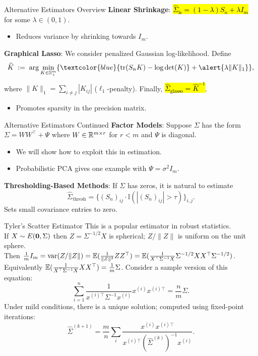 \documentclass[11pt,handout,aspectratio=169]{beamer}
\begin{document}
\begin{frame}{Alternative Estimators Overview}
  \textbf{Linear Shrinkage}: \hl{$\widehat{\Sigma}_{\text{ls}} = (1 - \lambda) S_n + \lambda I_m$} for some $\lambda\in (0,1)$.
  \begin{itemize}
  	\item Reduces variance by shrinking towards $I_m$.\\[5mm]
  \end{itemize}
  
 
  \textbf{Graphical Lasso}: We consider penalized Gaussian log-likelihood. Define
   \[\widehat{K} \;:=\; \arg\min_{K\in \mathbb S^m_+ }\{\textcolor{blue}{\mathrm{tr}(S_nK)-\log\det(K)}+\alert{\lambda\|K\|_1}\},\]
   where $\|K\|_1=\sum_{i\neq j}|K_{ij}|$ ($\ell_1$-penalty). Finally, 
  \hl{$\widehat \Sigma_{\text{glasso}}=\widehat K^{-1}$}.
  \begin{itemize}
  	\item Promotes sparsity in the precision matrix.
  \end{itemize}
\end{frame}

\begin{frame}{Alternative Estimators Continued}
  \textbf{Factor Models}: Suppose $\Sigma$ has the form
  $\Sigma = WW^\top + \Psi$ 
  where $W\in \mathbb R^{m\times r}$ for $r<m$ and $\Psi$ is diagonal.
  \begin{itemize}
  	\item We will show how to exploit this in estimation.
  	\item Probabilistic PCA gives one example with $\Psi=\sigma^2 I_m$. \\[5mm]
  \end{itemize}
  
  
  \textbf{Thresholding-Based Methods}: If $\Sigma$ has zeros, it is natural to estimate
  \[\widehat{\Sigma}_{\text{thresh}} = \{(S_n)_{ij} \cdot \mathbb{I}(|(S_n)_{ij}|>\tau)\}_{i,j}.\]
  Sets small covariance entries to zero.
\end{frame}

\begin{frame}{Tyler's Scatter Estimator}
This is a popular estimator in robust statistics. \\[4mm]
If $X\sim E(\boldsymbol 0,\Sigma)$ then $Z=\Sigma^{-1/2}X$ is spherical; $Z/\|Z\|$ is uniform on the unit sphere.\\[4mm]
Then $\tfrac1m I_m=\mathrm{var}(Z/\|Z\|)=\mathbb E(\tfrac{1}{\|Z\|^2}ZZ^\top)=\mathbb E(\tfrac{1}{X^\top \Sigma^{-1}X}\Sigma^{-1/2}XX^\top \Sigma^{-1/2})$.\\[4mm]
Equivalently $\mathbb E(\tfrac{1}{X^\top \Sigma^{-1}X}XX^\top)=\tfrac1m \Sigma$. Consider a sample version of this equation:
  \[\sum_{i=1}^n \frac{1}{x^{(i)\top}\Sigma^{-1}x^{(i)}}x^{(i)}x^{(i)\top} = \frac{n}{m}\Sigma.\]
  Under mild conditions, there is a unique solution; computed using fixed-point iterations:
  \[\hat{\Sigma}^{(k+1)} = \frac{m}{n}\sum_{i}\frac{x^{(i)}x^{(i)\top}}{x^{(i)\top}(\hat{\Sigma}^{(k)})^{-1}x^{(i)}}.\]
\end{frame}
\end{document}

